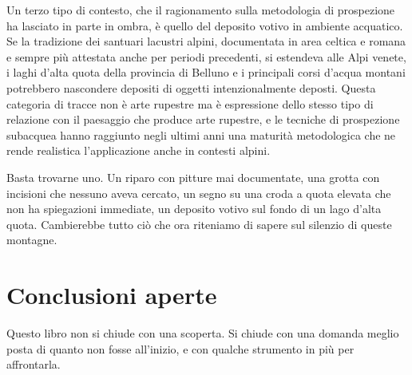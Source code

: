 Un terzo tipo di contesto, che il ragionamento sulla metodologia di prospezione ha lasciato in parte in ombra, è quello del deposito votivo in ambiente acquatico. Se la tradizione dei santuari lacustri alpini, documentata in area celtica e romana e sempre più attestata anche per periodi precedenti, si estendeva alle Alpi venete, i laghi d'alta quota della provincia di Belluno e i principali corsi d'acqua montani potrebbero nascondere depositi di oggetti intenzionalmente deposti. Questa categoria di tracce non è arte rupestre ma è espressione dello stesso tipo di relazione con il paesaggio che produce arte rupestre, e le tecniche di prospezione subacquea hanno raggiunto negli ultimi anni una maturità metodologica che ne rende realistica l'applicazione anche in contesti alpini.

Basta trovarne uno. Un riparo con pitture mai documentate, una grotta con incisioni che nessuno aveva cercato, un segno su una croda a quota elevata che non ha spiegazioni immediate, un deposito votivo sul fondo di un lago d'alta quota. Cambierebbe tutto ciò che ora riteniamo di sapere sul silenzio di queste montagne.

\section{Conclusioni aperte}
\label{cap:conclusioni}

Questo libro non si chiude con una scoperta. Si chiude con una domanda meglio posta di quanto non fosse all'inizio, e con qualche strumento in più per affrontarla.

